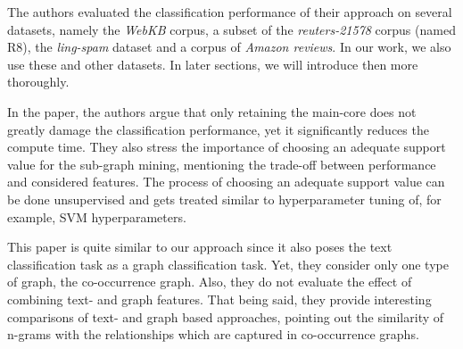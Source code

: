 The authors evaluated the classification performance of their approach on several datasets, namely the \textit{WebKB} corpus, a subset of the \textit{reuters-21578} corpus (named R8), the \textit{ling-spam} dataset and a corpus of \textit{Amazon reviews}.
In our work, we also use these and other datasets. In later sections, we will introduce then more thoroughly.

In the paper, the authors argue that only retaining the main-core does not greatly damage the classification performance, yet it significantly reduces the compute time.
They also stress the importance of choosing an adequate support value for the sub-graph mining, mentioning the trade-off between performance and considered features. The process of choosing an adequate support value can be done unsupervised and gets treated similar to hyperparameter tuning of, for example, SVM hyperparameters.

This paper is quite similar to our approach since it also poses the text classification task as a graph classification task. Yet, they consider only one type of graph, the co-occurrence graph.
Also, they do not evaluate the effect of combining text- and graph features.
That being said, they provide interesting comparisons of text- and graph based approaches, pointing out the similarity of n-grams with the relationships which are captured in co-occurrence graphs.

